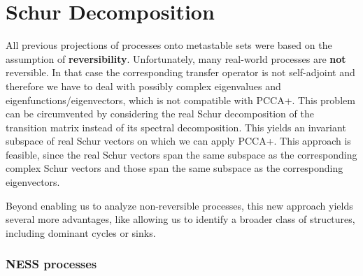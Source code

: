 \section{Schur Decomposition}
\label{sec:nonreversible}

All previous projections of processes onto metastable sets were based on the assumption of \textbf{reversibility}.
Unfortunately, many real-world processes are \textbf{not} reversible. In that case the corresponding transfer operator is not self-adjoint and therefore we have to deal with possibly complex eigenvalues and eigenfunctions/eigenvectors, which is not compatible with PCCA+. %
This problem can be circumvented by considering the real Schur decomposition of the transition matrix instead of its spectral decomposition. 
This yields an invariant subspace of real Schur vectors on which we can apply PCCA+.
This approach is feasible, since the real Schur vectors span the same subspace as the corresponding complex Schur vectors and those span the same subspace as the corresponding eigenvectors. 

Beyond enabling us to analyze non-reversible processes, this new approach yields several more advantages, like allowing us to identify a broader class of structures, including dominant cycles or sinks.


\subsubsection*{NESS processes}

